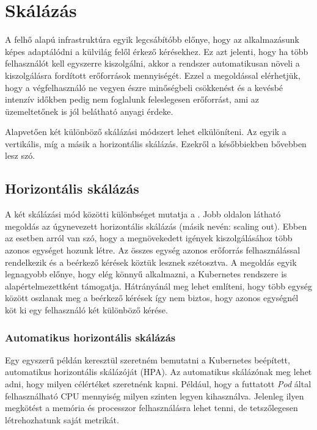 \section{Skálázás}
A felhő alapú infrastruktúra egyik legcsábítóbb előnye, hogy az alkalmazásunk képes adaptálódni a külvilág felől érkező kérésekhez. Ez azt jelenti, hogy ha több felhasználót kell egyszerre kiszolgálni, akkor a rendszer automatikusan növeli a kiszolgálásra fordított erőforrások mennyiségét. Ezzel a megoldással elérhetjük, hogy a végfelhasználó ne vegyen észre minőségbeli csökkenést és a kevésbé intenzív időkben pedig nem foglalunk feleslegesen erőforrást, ami az üzemeltetőnek is jól belátható anyagi érdeke.
 
Alapvetően két különböző skálázási módszert lehet elkülöníteni. Az egyik a vertikális, míg a másik a horizontális skálázás. Ezekről a későbbiekben bővebben lesz szó. 

\subsection{Horizontális skálázás}
A két skálázási mód közötti különbséget mutatja a . Jobb oldalon látható megoldás az úgynevezett horizontális skálázás (másik nevén: scaling out). Ebben az esetben arról van szó, hogy a megnövekedett igények kiszolgálásához több azonos egységet hozunk létre. Az összes egység azonos erőforrás felhasználással rendelkezik és a beérkező kérések köztük lesznek szétosztva. 
A megoldás egyik legnagyobb előnye, hogy elég könnyű alkalmazni, a Kubernetes rendszere is alapértelmezettként támogatja. Hátrányánál meg lehet említeni, hogy több egység között oszlanak meg a beérkező kérések így nem biztos, hogy azonos egységnél köt ki egy felhasználó két különböző kérése. 

\subsubsection{Automatikus horizontális skálázás}
\label{subsec:hpa}
Egy egyszerű példán keresztül szeretném bemutatni a Kubernetes beépített, automatikus horizontális skálázóját (HPA). Az automatikus skálázónak meg lehet adni, hogy milyen célértéket szeretnénk kapni. Például, hogy a futtatott \textit{Pod} által felhasználható CPU mennyiség milyen szinten legyen kihasználva. Jelenleg ilyen megkötést a memória és processzor felhasználásra lehet tenni, de tetszőlegesen létrehozhatunk saját metrikát. 

